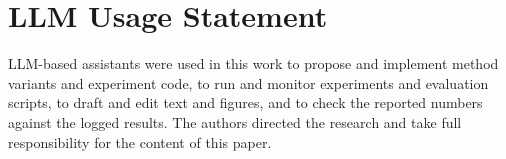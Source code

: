 \section*{LLM Usage Statement}
LLM-based assistants were used in this work to propose and implement method variants and experiment code, to run and
monitor experiments and evaluation scripts, to draft and edit text and figures, and to check the reported numbers
against the logged results. The authors directed the research and take full responsibility for the content of this
paper.
